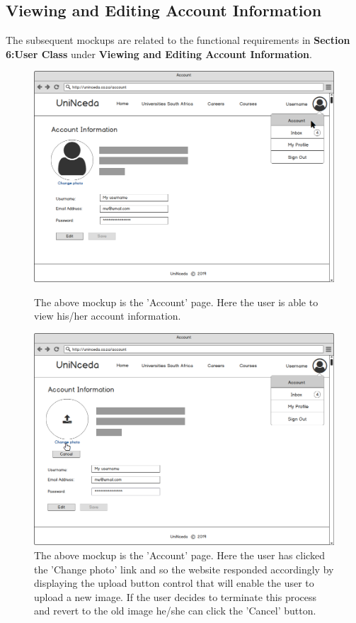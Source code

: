 \documentclass[a4paper, 12pt]{article}
\begin{document}
\newpage
\subsection{Viewing and Editing Account Information}
The subsequent mockups are related to the functional requirements in \textbf{Section 6:User Class} under \textbf{Viewing and Editing Account Information}.
\setcounter{figure}{0}

\begin{figure}[H]
\centering
\includegraphics[scale=0.35]{Account}
\caption{The above mockup is the 'Account' page. Here the user is able to view his/her account information.}
\label{Account}

\vspace{1cm}

\includegraphics[scale=0.35]{AccountPhotoChange}
\caption{The above mockup is the 'Account' page. Here the user has clicked the 'Change photo' link and so the website responded accordingly by displaying the upload button control that will enable the user to upload a new image. If the user decides to terminate this process and revert to the old image he/she can click the 'Cancel' button.}
\label{AccountPhotoChange}
\end{figure}
\end{document}
